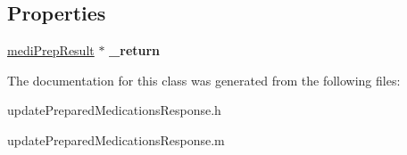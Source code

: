 \subsection*{Properties}
\begin{DoxyCompactItemize}
\item 
\hypertarget{interfaceupdate_prepared_medications_response_af4ba7d65fc546dec1774a8da8ac96068}{}\hyperlink{interfacemedi_prep_result}{medi\+Prep\+Result} $\ast$ {\bfseries \+\_\+return}\label{interfaceupdate_prepared_medications_response_af4ba7d65fc546dec1774a8da8ac96068}

\end{DoxyCompactItemize}


The documentation for this class was generated from the following files\+:\begin{DoxyCompactItemize}
\item 
update\+Prepared\+Medications\+Response.\+h\item 
update\+Prepared\+Medications\+Response.\+m\end{DoxyCompactItemize}
